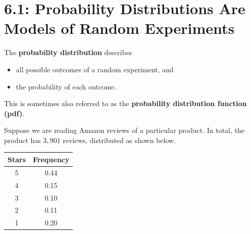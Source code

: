 \documentclass[../mathNotesPreamble]{subfiles}
\providecommand{\relscalefact}{1.4}
\begin{document}
\relscale{\relscalefact}
  \section{6.1: Probability Distributions Are Models of Random Experiments}
    \begin{defn*}
      The \textbf{probability distribution} describes
      \begin{itemize}
        \item all possible outcomes of a random experiment, and
        \item the probability of each outcome.
      \end{itemize}
      This is sometimes also referred to as the \textbf{probability distribution function (pdf)}.
    \end{defn*}

    \begin{ex*}
      Suppose we are reading Amazon reviews of a particular product. In total, the product has $3,901$ reviews, distributed as shown below.
    \end{ex*}

    \begin{center}
      \begin{minipage}{0.2\linewidth}
        \begin{tabular}{@{}cc@{}}\toprule
          Stars& Frequency\\\midrule
          5 & 0.44\\
          4 & 0.15\\
          3 & 0.10\\
          2 & 0.11\\
          1 & 0.20\\\bottomrule
        \end{tabular}
      \end{minipage}\hspace*{15mm}%
      \begin{minipage}{0.425\linewidth}
      \end{minipage}
    \end{center}
\end{document}
